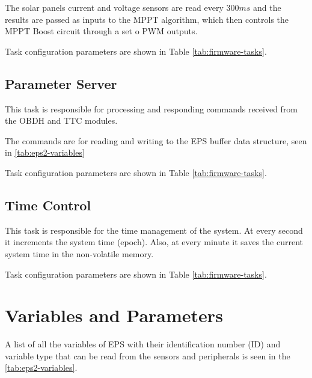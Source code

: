 The solar panels current and voltage sensors are read every \(300 ms\) and the results are passed as inputs to the MPPT algorithm, which then controls the MPPT Boost circuit through a set o PWM outputs.

Task configuration parameters are shown in Table \ref{tab:firmware-tasks}.

\subsection{Parameter Server}

This task is responsible for processing and responding commands received from the OBDH and TTC modules.

The commands are for reading and writing to the EPS buffer data structure, seen in \autoref{tab:eps2-variables}

Task configuration parameters are shown in Table \ref{tab:firmware-tasks}.

\subsection{Time Control}

This task is responsible for the time management of the system.
At every second it increments the system time (epoch).
Also, at every minute it saves the current system time in the non-volatile memory.

Task configuration parameters are shown in Table \ref{tab:firmware-tasks}.





\section{Variables and Parameters}

A list of all the variables of EPS with their identification number (ID) and variable type that can be read from the sensors and peripherals is seen in the \autoref{tab:eps2-variables}.

